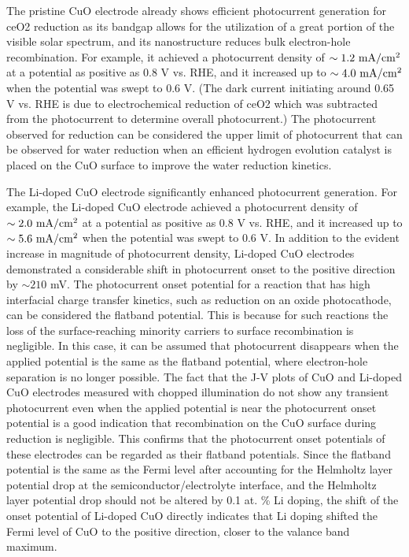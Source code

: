 The pristine CuO electrode already shows efficient photocurrent generation for ce{O2} reduction as its bandgap allows for the utilization of a great portion of the visible solar spectrum, and its nanostructure reduces bulk electron-hole recombination.  For example, it achieved a photocurrent density of $\sim 1.2\ {\rm mA/cm^2}$ at a potential as positive as 0.8 V vs. RHE, and it increased up to $\sim 4.0\ {\rm mA/cm^2}$ when the potential was swept to 0.6 V. (The dark current initiating around 0.65 V vs. RHE is due to electrochemical reduction of ce{O2} which was subtracted from the photocurrent to determine overall photocurrent.) The photocurrent observed for  reduction can be considered the upper limit of photocurrent that can be observed for water reduction when an efficient hydrogen evolution catalyst is placed on the CuO surface to improve the water reduction kinetics.

The Li-doped CuO electrode significantly enhanced photocurrent generation. For example, the Li-doped CuO electrode achieved a photocurrent density of $\sim 2.0\ {\rm mA/cm^2}$ at a potential as positive as 0.8 V vs. RHE, and it increased up to $\sim 5.6\ {\rm mA/cm^2}$ when the potential was swept to 0.6 V. In addition to the evident increase in magnitude of photocurrent density, Li-doped CuO electrodes demonstrated a considerable shift in photocurrent onset to the positive direction by $\sim 210$ mV. The photocurrent onset potential for a reaction that has high interfacial charge transfer kinetics, such as  reduction on an oxide photocathode, can be considered the flatband potential. This is because for such reactions the loss of the surface-reaching minority carriers to surface recombination is negligible.  In this case, it can be assumed that photocurrent disappears when the applied potential is the same as the flatband potential, where electron-hole separation is no longer possible.  The fact that the J-V plots of CuO and Li-doped CuO electrodes measured with chopped illumination do not show any transient photocurrent even when the applied potential is near the photocurrent onset potential is a good indication that recombination on the CuO surface during  reduction is negligible. This confirms that the photocurrent onset potentials of these electrodes can be regarded as their flatband potentials. Since the flatband potential is the same as the Fermi level after accounting for the Helmholtz layer potential drop at the semiconductor/electrolyte interface, and the Helmholtz layer potential drop should not be altered by 0.1 at. \% Li doping, the shift of the onset potential of Li-doped CuO directly indicates that Li doping shifted the Fermi level of CuO to the positive direction, closer to the valance band maximum.~\cite{nozik1978photoelectrochemistry}

